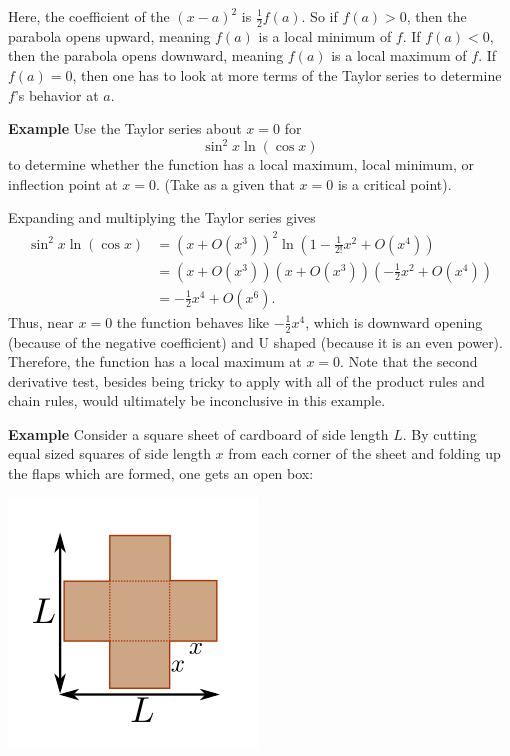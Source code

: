 \documentclass[twoside,openright,titlepage,a4paper]{book}
\begin{document}
\begin{sloppypar}
Here, the coefficient of the $(x-a)^2$ is $\frac{1}{2}f(a)$. So if $f(a)>0$, then the parabola opens upward, meaning $f(a)$ is a local minimum of $f$. If $f(a)<0$, then the parabola opens downward, meaning $f(a)$ is a local maximum of $f$. If $f(a)=0$, then one has to look at more terms of the Taylor series to determine $f$'s behavior at $a$.	

\textbf{Example} Use the Taylor series about $x=0$ for \[ \sin^2x \ln(\cos x) \] to determine whether the function has a local maximum, local minimum, or inflection point at $x=0$. (Take as a given that $x=0$ is a critical point).
\begin{examplebox}
Expanding and multiplying the Taylor series gives
\begin{align*}
\sin^2 x \ln (\cos x) &= \left( x+ O(x^3) \right)^2 \ln \left( 1 - \frac{1}{2!}x^2 + O(x^4) \right) \\
&= (x + O(x^3))(x+ O(x^3)) \left(-\frac{1}{2}x^2 + O(x^4)\right) \\
&= -\frac{1}{2}x^4 + O(x^6). 
\end{align*}
Thus, near $x=0$ the function behaves like $-\frac{1}{2}x^4$, which is downward opening (because of the negative coefficient) and U shaped (because it is an even power). Therefore, the function has a local maximum at $x=0$.
Note that the second derivative test, besides being tricky to apply with all of the product rules and chain rules, would ultimately be inconclusive in this example.	
\end{examplebox}

\textbf{Example} Consider a square sheet of cardboard of side length $L$. By cutting equal sized squares of side length $x$ from each corner of the sheet and folding up the flaps which are formed, one gets an open box:
\begin{center}\includegraphics[scale=0.6]{BoxMax}\end{center}


\end{sloppypar}
\end{document}
